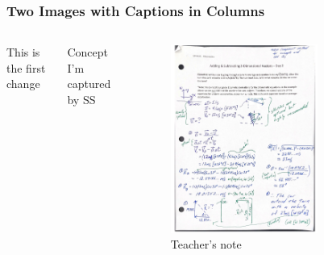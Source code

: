 \documentclass[10pt]{beamer}
\begin{document}
\begin{frame}
  \frametitle{Two Images with Captions in Columns}
  \begin{columns}
    This is the first change 
    \begin{alertblock}{Concept}
      I'm captured by SS
    \end{alertblock}

    \begin{center}
      \begin{figure}
        \includegraphics[width=0.7\textwidth]{teacherNote2.png}
        \caption{Teacher's note}
      \end{figure}
    \end{center}
  \end{columns}

\end{frame}
\end{document}
